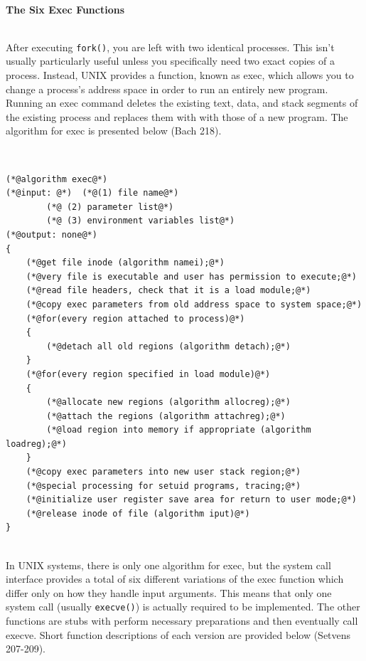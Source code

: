 \documentclass[12pt]{extarticle}
\newenvironment{myindentpar}[1]%
 {\begin{list}{}%
         {\setlength{\leftmargin}{#1}}%
         \item[]%
 }
 {\end{list}}
\newcommand{\code}[1]{\colorbox{codegray}{\texttt{#1}}}
\begin{document}
\begin{myindentpar}{5mm}
    \vspace{3mm}
    \ \\
    \textbf{The Six Exec Functions}
    
    \ \\
    After executing \code{fork()}, you are left with two identical processes.  This isn't usually particularly useful unless you specifically need two exact copies of a process.  Instead, UNIX provides a function, known as exec, which allows you to change a process's address space in order to run an entirely new program.  Running an exec command deletes the existing text, data, and stack segments of the existing process and replaces them with with those of a new program.  The algorithm for exec is presented below (Bach 218).  
    
\ \\
\begin{lstlisting}[frame=single]
(*@algorithm exec@*)
(*@input: @*)  (*@(1) file name@*)
        (*@ (2) parameter list@*)
        (*@ (3) environment variables list@*)
(*@output: none@*)
{
    (*@get file inode (algorithm namei);@*)
    (*@very file is executable and user has permission to execute;@*)
    (*@read file headers, check that it is a load module;@*)
    (*@copy exec parameters from old address space to system space;@*)
    (*@for(every region attached to process)@*)
    {
        (*@detach all old regions (algorithm detach);@*)
    }
    (*@for(every region specified in load module)@*)
    {
        (*@allocate new regions (algorithm allocreg);@*)
        (*@attach the regions (algorithm attachreg);@*)
        (*@load region into memory if appropriate (algorithm loadreg);@*)
    }
    (*@copy exec parameters into new user stack region;@*)
    (*@special processing for setuid programs, tracing;@*)
    (*@initialize user register save area for return to user mode;@*)
    (*@release inode of file (algorithm iput)@*)
}
\end{lstlisting}

    \ \\
    In UNIX systems, there is only one algorithm for exec, but the system call interface provides a total of six different variations of the exec function which differ only on how they handle input arguments.  This means that only one system call (usually \code{execve()}) is actually required to be implemented.  The other functions are stubs with perform necessary preparations and then eventually call execve.  Short function descriptions of each version are provided below (Setvens 207-209).  


\end{myindentpar}
\end{document}
